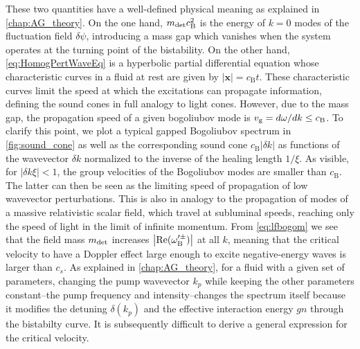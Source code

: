These two quantities have a well-defined physical meaning as explained in \autoref{chap:AG_theory}. 
On the one hand, $m_{\mathrm{det}} c_\mathrm{B}^2$ is the energy of $k=0$ modes of the fluctuation field $\delta \psi$, introducing a mass gap which vanishes when the system operates at the turning point of the bistability.
On the other hand, \autoref{eq:HomogPertWaveEq} is a hyperbolic partial differential equation whose characteristic curves in a fluid at rest are given by $|\pmb{x}|=c_\mathrm{B} t$. These characteristic curves limit the speed at which the excitations can propagate information, defining the sound cones in full analogy to light cones. However, due to the mass gap, the propagation speed of a given bogoliubov mode is $v_{\rm g}=d\omega/dk\leq c_\mathrm{B}$. 
To clarify this point, we plot a typical gapped Bogoliubov spectrum in \autoref{fig:sound_cone} as well as the corresponding sound cone $c_\mathrm{B}|\delta k|$ as functions of the wavevector $\delta k$ normalized to the inverse of the healing length $1/\xi$. As visible, for $|\delta k \xi|<1$, the group velocities of the Bogoliubov modes are smaller than $c_\mathrm{B}$.
The latter can then be seen as the limiting speed of propagation of low wavevector perturbations. This is also in analogy to the propagation of modes of a massive relativistic scalar field, which travel at subluminal speeds, reaching only the speed of light in the limit of infinite momentum.
From \autoref{eq:lfbogom} we see that the field mass $m_{\mathrm{det}}$ increases $\abs{\mathrm{Re}(\omega_\mathrm{B}^{\prime\pm})}$ at all $k$, meaning that the critical velocity to have a Doppler effect large enough to excite negative-energy  waves is larger than $c_s$.
As explained in \autoref{chap:AG_theory}, for a fluid with a given set of parameters, changing the pump wavevector $k_p$ while keeping the other parameters constant--the pump frequency and intensity--changes the spectrum itself 
because it modifies the detuning $\delta(k_p)$ and the effective interaction energy $gn$ through the bistabilty curve. It is subsequently difficult to derive a general expression for the critical velocity.

